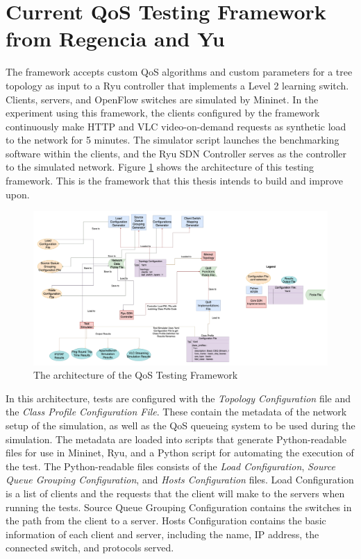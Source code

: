 \section{Current QoS Testing Framework from Regencia and Yu}
The framework accepts custom QoS algorithms and custom parameters for a tree topology as input to a Ryu controller that implements a Level 2 learning switch. Clients, servers, and OpenFlow switches are simulated by Mininet. In the experiment using this framework, the clients configured by the framework continuously make HTTP and VLC video-on-demand requests as synthetic load to the network for 5 minutes. The simulator script launches the benchmarking software within the clients, and the Ryu SDN Controller serves as the controller to the simulated network. Figure \ref{fig:original_architecture} shows the architecture of this testing framework. This is the framework that this thesis intends to build and improve upon.

\begin{figure}[htbp!]
    \centering
    \includegraphics[width=\textwidth]{Figures/original_architecture.png}
    \caption{The architecture of the QoS Testing Framework}
    \label{fig:original_architecture}
\end{figure}

In this architecture, tests are configured with the \textit{Topology Configuration} file and the \textit{Class Profile Configuration File}. These contain the metadata of the network setup of the simulation, as well as the QoS queueing system to be used during the simulation. The metadata are loaded into scripts that generate Python-readable files for use in Mininet, Ryu, and a Python script for automating the execution of the test. The Python-readable files consists of the \textit{Load Configuration}, \textit{Source Queue Grouping Configuration}, and \textit{Hosts Configuration} files. Load Configuration is a list of clients and the requests that the client will make to the servers when running the tests. Source Queue Grouping Configuration contains the switches in the path from the client to a server. Hosts Configuration contains the basic information of each client and server, including the name, IP address, the connected switch, and protocols served.

